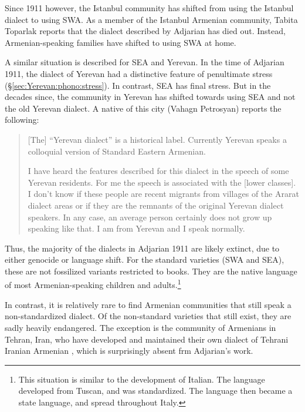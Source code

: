 Since 1911 however, the Istanbul community has shifted from using the Istanbul dialect to using SWA. As a member of the Istanbul Armenian community, Tabita Toparlak reports that the dialect described by Adjarian has died out. Instead, Armenian-speaking families   have shifted to using SWA at home. 




A similar situation is described for SEA and  Yerevan. In the time of Adjarian 1911, the dialect of Yerevan  had a distinctive feature of penultimate stress (\S\ref{sec:Yerevan:phono:stress}). In contrast, SEA has final stress. But in the decades since, the community in Yerevan has shifted towards using SEA and not the old Yerevan dialect.  A native of this city (Vahagn Petrosyan) reports the following:

\begin{quote}
	[The] ``Yerevan dialect'' is a historical label. Currently Yerevan speaks a colloquial version of Standard Eastern Armenian.
	
	I have heard the features described for this dialect in the speech of some Yerevan residents. For me the speech is associated with the [lower classes]. I don't know if these people are recent migrants from villages of the Ararat dialect areas or if they are the remnants of the original Yerevan dialect speakers. In any case, an average person certainly does not grow up speaking like that. I am from Yerevan and I speak normally. 
\end{quote}

Thus, the majority of the dialects in Adjarian 1911 are likely extinct, due to either genocide or language shift. For the standard varieties (SWA and SEA), these are not fossilized variants restricted to books. They are the native language of most Armenian-speaking children and adults.\footnote{This situation is similar to the development of Italian. The language developed from Tuscan, and was standardized. The language then became a state language, and spread throughout Italy. }

In contrast, it is relatively rare to find Armenian communities that still speak a non-standardized dialect. Of the non-standard varieties that still exist, they are sadly heavily endangered. The  exception is the community of Armenians in Tehran, Iran, who have developed and maintained their own dialect of Tehrani Iranian Armenian \citep{DolatianEtAl-prep-IranianGrammar}, which is surprisingly absent frm Adjarian's work.




